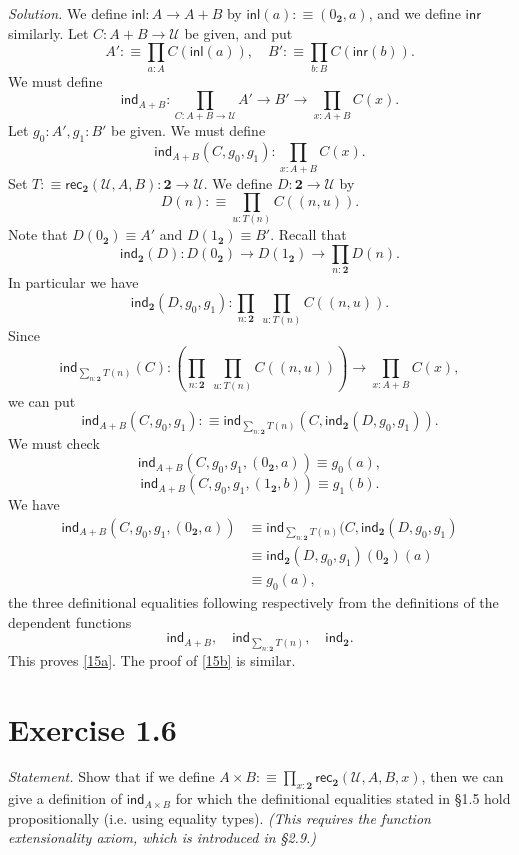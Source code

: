 \documentclass[12pt]{article}
\newcommand{\ind}{\mathsf{ind}}
\newcommand{\inl}{\mathsf{inl}}
\newcommand{\inr}{\mathsf{inr}}
\newcommand{\nn}{\noindent}
\newcommand{\rec}{\mathsf{rec}}
\newcommand{\two}{\mathbf2}
\newcommand{\U}{\mathcal U}
\begin{document}
\nn\emph{Solution.} We define $\inl:A\to A+B$ by $\inl(a):\equiv(0_\two,a)$, and we define $\inr$ similarly. Let $C:A+B\to\U$ be given, and put 
$$
A':\equiv\prod_{a:A}C(\inl(a)),\quad B':\equiv\prod_{b:B}C(\inr(b)).
$$
We must define 
$$
\ind_{A+B}:\prod_{C:A+B\to\U}A'\to B'\to\prod_{x:A+B}C(x).
$$ 
Let $g_0:A',g_1:B'$ be given. We must define 
$$
\ind_{A+B}(C,g_0,g_1):\prod_{x:A+B}C(x).
$$ 
Set $T:\equiv\rec_\two(\U,A,B):\two\to\U$. We define $D:\two\to\U$ by 
$$
D(n):\equiv\prod_{u:T(n)}C((n,u)).
$$ 
Note that $D(0_\two)\equiv A'$ and $D(1_\two)\equiv B'$. Recall that 
$$
\ind_\two(D):D(0_\two)\to D(1_\two)\to\prod_{n:\two}D(n).
$$ 
In particular we have 
$$
\ind_\two(D,g_0,g_1):\prod_{n:\two}\ \prod_{u:T(n)}C((n,u)).
$$ 
Since 
$$
\ind_{\sum_{n:\two}T(n)}(C):\left(\prod_{n:\two}\ \prod_{u:T(n)}C((n,u))\right)\to\prod_{x:A+B}C(x),
$$ 
we can put 
$$
\ind_{A+B}(C,g_0,g_1):\equiv\ind_{\sum_{n:\two}T(n)}(C,\ind_\two(D,g_0,g_1)).
$$ 
We must check 
\begin{equation}\label{15a}
\ind_{A+B}(C,g_0,g_1,(0_\two,a))\equiv g_0(a),
\end{equation}
\begin{equation}\label{15b}
\ind_{A+B}(C,g_0,g_1,(1_\two,b))\equiv g_1(b).
\end{equation} 
We have 
\begin{align*}
\ind_{A+B}(C,g_0,g_1,(0_\two,a))&\equiv\ind_{\sum_{n:\two}T(n)}(C,\ind_\two(D,g_0,g_1)\\ 
&\equiv\ind_\two(D,g_0,g_1)(0_\two)(a)\\ 
&\equiv g_0(a),
\end{align*}
the three definitional equalities following respectively from the definitions of the dependent functions
$$
\ind_{A+B},\quad\ind_{\sum_{n:\two}T(n)},\quad\ind_\two.
$$ 
This proves \eqref{15a}. The proof of \eqref{15b} is similar.


\section{Exercise 1.6}

\emph{Statement.} Show that if we define $A\times B:\equiv\prod_{x:\two}\rec_\two(\U,A,B,x)$, then we can give a definition of  $\ind_{A\times B}$ for which the definitional equalities stated in \S1.5 hold propositionally (i.e. using equality types). \emph{(This requires the function extensionality axiom, which is introduced in \S2.9.)}
\end{document}
